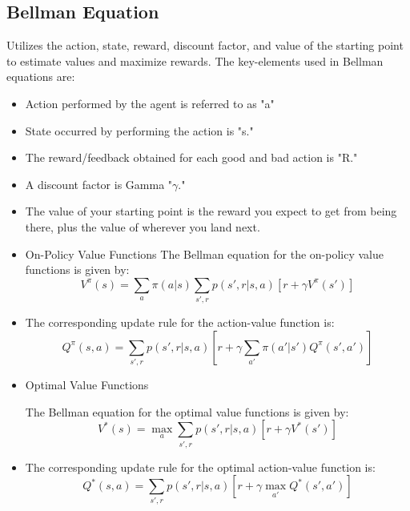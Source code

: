 \subsection*{Bellman Equation}
Utilizes the action, state, reward, discount factor, and value of the starting point to estimate values and maximize rewards.
The key-elements used in Bellman equations are:
\begin{itemize}
    \item Action performed by the agent is referred to as "a"
    \item State occurred by performing the action is "s."
    \item The reward/feedback obtained for each good and bad action is "R."
    \item A discount factor is Gamma "$\gamma$."
    \item The value of your starting point is the reward you expect to get from being there, plus the value of wherever you land next.
    \item {On-Policy Value Functions}
        The Bellman equation for the on-policy value functions is given by:
        \begin{equation}
            V^{\pi}(s) = \sum_a \pi(a|s) \sum_{s', r} p(s', r|s, a) \left[r + \gamma V^{\pi}(s')\right]
        \end{equation}
    \item The corresponding update rule for the action-value function is:
        \begin{equation}
            Q^{\pi}(s, a) = \sum_{s', r} p(s', r|s, a) \left[r + \gamma \sum_{a'} \pi(a'|s') Q^{\pi}(s', a')\right]
        \end{equation}

    \item {Optimal Value Functions}

        The Bellman equation for the optimal value functions is given by:
        \begin{equation}
            V^*(s) = \max_a \sum_{s', r} p(s', r|s, a) \left[r + \gamma V^*(s')\right]
        \end{equation}
    \item The corresponding update rule for the optimal action-value function is:
        \begin{equation}
            Q^*(s, a) = \sum_{s', r} p(s', r|s, a) \left[r + \gamma \max_{a'} Q^*(s', a')\right]
        \end{equation}
\end{itemize}



